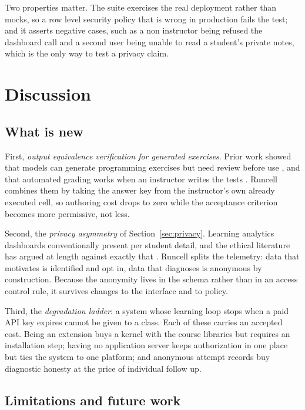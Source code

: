 \documentclass[manuscript]{acmart}
\begin{document}
Two properties matter. The suite exercises the real deployment rather than
mocks, so a row level security policy that is wrong in production fails the
test; and it asserts negative cases, such as a non instructor being refused the
dashboard call and a second user being unable to read a student's private
notes, which is the only way to test a privacy claim.

\section{Discussion}

\subsection{What is new}

First, \emph{output equivalence verification for generated exercises}. Prior
work showed that models can generate programming exercises but need review
before use \cite{sarsa2022automatic}, and that automated grading works when an
instructor writes the tests \cite{blank2019nbgrader}. Runcell combines them by
taking the answer key from the instructor's own already executed cell, so
authoring cost drops to zero while the acceptance criterion becomes more
permissive, not less.

Second, the \emph{privacy asymmetry} of Section~\ref{sec:privacy}. Learning
analytics dashboards conventionally present per student detail, and the ethical
literature has argued at length against exactly that \cite{slade2013learning}.
Runcell splits the telemetry: data that motivates is identified and opt in,
data that diagnoses is anonymous by construction. Because the anonymity lives
in the schema rather than in an access control rule, it survives changes to the
interface and to policy.

Third, the \emph{degradation ladder}: a system whose learning loop stops when a
paid API key expires cannot be given to a class. Each of these carries an
accepted cost. Being an extension buys a kernel with the course libraries but
requires an installation step; having no application server keeps authorization
in one place but ties the system to one platform; and anonymous attempt records
buy diagnostic honesty at the price of individual follow up.

\subsection{Limitations and future work}
\end{document}
